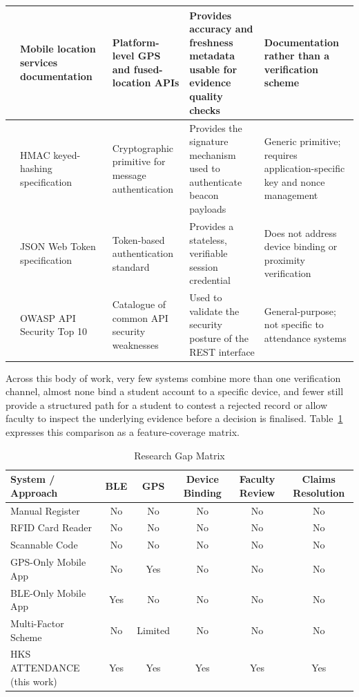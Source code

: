 \documentclass[12pt, a4paper, oneside]{report}
\begin{document}
\begin{table}[p]
\begin{tabularx}{\textwidth}{|>{\centering\arraybackslash}p{0.55cm}|X|X|X|X|}
\hline
9 & Mobile location services documentation~\cite{ref10,ref11} & Platform-level GPS and fused-location APIs & Provides accuracy and freshness metadata usable for evidence quality checks & Documentation rather than a verification scheme \\
\hline
10 & HMAC keyed-hashing specification~\cite{ref16} & Cryptographic primitive for message authentication & Provides the signature mechanism used to authenticate beacon payloads & Generic primitive; requires application-specific key and nonce management \\
\hline
11 & JSON Web Token specification~\cite{ref17} & Token-based authentication standard & Provides a stateless, verifiable session credential & Does not address device binding or proximity verification \\
\hline
12 & OWASP API Security Top 10~\cite{ref15} & Catalogue of common API security weaknesses & Used to validate the security posture of the REST interface & General-purpose; not specific to attendance systems \\
\hline
\end{tabularx}
\end{table}

Across this body of work, very few systems combine more than one verification channel, almost none bind a student account to a specific device, and fewer still provide a structured path for a student to contest a rejected record or allow faculty to inspect the underlying evidence before a decision is finalised. Table~\ref{tab:gap-matrix} expresses this comparison as a feature-coverage matrix.

\begin{table}[htbp]
\centering
\caption{Research Gap Matrix}
\label{tab:gap-matrix}
\small
\setlength{\tabcolsep}{4pt}
\begin{tabularx}{\textwidth}{|X|c|c|c|c|c|}
\hline
\textbf{System / Approach} & \textbf{BLE} & \textbf{GPS} & \textbf{Device Binding} & \textbf{Faculty Review} & \textbf{Claims Resolution} \\
\hline
Manual Register & No & No & No & No & No \\
\hline
RFID Card Reader & No & No & No & No & No \\
\hline
Scannable Code & No & No & No & No & No \\
\hline
GPS-Only Mobile App & No & Yes & No & No & No \\
\hline
BLE-Only Mobile App~\cite{ref1,ref2} & Yes & No & No & No & No \\
\hline
Multi-Factor Scheme~\cite{ref4} & No & Limited & No & No & No \\
\hline
HKS ATTENDANCE (this work) & Yes & Yes & Yes & Yes & Yes \\
\hline
\end{tabularx}
\end{table}
\end{document}
